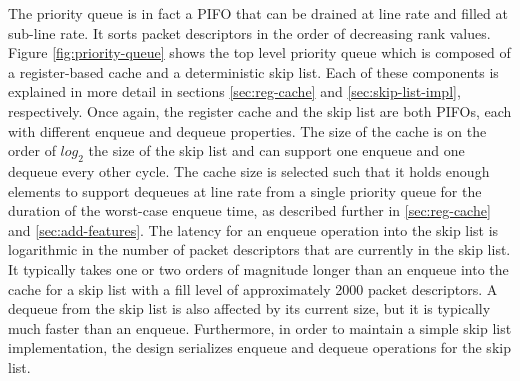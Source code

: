 The priority queue is in fact a PIFO that can be drained at line rate and filled at sub-line rate. It sorts packet descriptors in the order of decreasing rank values. Figure \ref{fig:priority-queue} shows the top level priority queue which is composed of a register-based cache and a deterministic skip list. Each of these components is explained in more detail in sections \ref{sec:reg-cache} and \ref{sec:skip-list-impl}, respectively. Once again, the register cache and the skip list are both PIFOs, each with different enqueue and dequeue properties. The size of the cache is on the order of $log_2$ the size of the skip list and can support one enqueue and one dequeue every other cycle. The cache size is selected such that it holds enough elements to support dequeues at line rate from a single priority queue for the duration of the worst-case enqueue time, as described further in \ref{sec:reg-cache} and \ref{sec:add-features}.  The latency for an enqueue operation into the skip list is logarithmic in the number of packet descriptors that are currently in the skip list. It typically takes one or two orders of magnitude longer than an enqueue into the cache for a skip list with a fill level of approximately 2000 packet descriptors. A dequeue from the skip list is also affected by its current size, but it is typically much faster than an enqueue. Furthermore, in order to maintain a simple skip list implementation, the design serializes enqueue and dequeue operations for the skip list.







